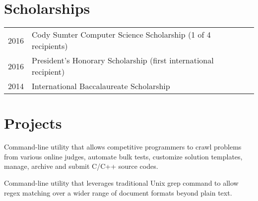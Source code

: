 \documentclass[letterpaper]{deedy-resume} %
\begin{document}
\begin{minipage}[t]{0.66\textwidth}
\section{Scholarships} 

\begin{tabular}{rll}
2016 & Cody Sumter Computer Science Scholarship (1 of 4 recipients)\\
2016 & President's Honorary Scholarship (first international recipient)\\
2014 & International Baccalaureate Scholarship
\end{tabular}

\sectionspace %

\section{Projects}

Command-line utility that allows competitive programmers to crawl problems from various online judges, automate bulk tests, customize solution templates, manage, archive and submit C/C++ source codes.

\sectionspace %

Command-line utility that leverages traditional Unix grep command to allow regex matching over a wider range of document formats beyond plain text.

\sectionspace  %


\end{minipage} %



\end{document}
